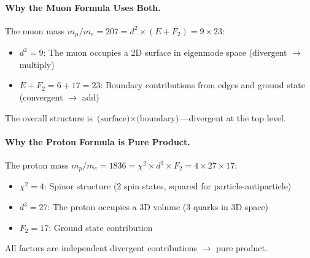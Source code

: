 \documentclass[11pt,a4paper]{book}
\begin{document}
\paragraph{Why the Muon Formula Uses Both.}

The muon mass $m_\mu / m_e = 207 = d^2 \times (E + F_2) = 9 \times 23$:
\begin{itemize}
\item $d^2 = 9$: The muon occupies a 2D surface in eigenmode space (divergent $\to$ multiply)
\item $E + F_2 = 6 + 17 = 23$: Boundary contributions from edges and ground state (convergent $\to$ add)
\end{itemize}

The overall structure is $\text{(surface)} \times \text{(boundary)}$---divergent at the top level.

\paragraph{Why the Proton Formula is Pure Product.}

The proton mass $m_p / m_e = 1836 = \chi^2 \times d^3 \times F_2 = 4 \times 27 \times 17$:
\begin{itemize}
\item $\chi^2 = 4$: Spinor structure (2 spin states, squared for particle-antiparticle)
\item $d^3 = 27$: The proton occupies a 3D volume (3 quarks in 3D space)
\item $F_2 = 17$: Ground state contribution
\end{itemize}

All factors are independent divergent contributions $\to$ pure product.
\end{document}
